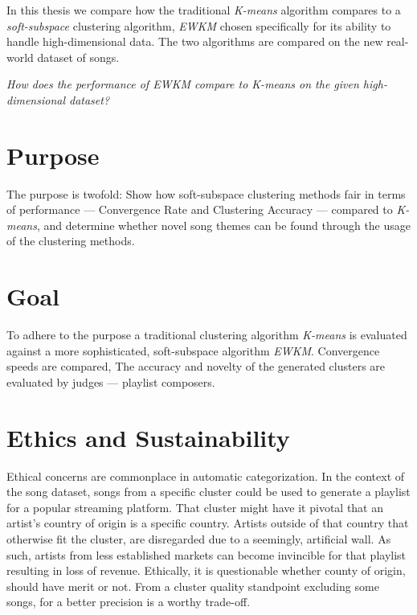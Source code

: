 \documentclass[../report.tex]{subfiles}
\begin{document}
In this thesis we compare how the traditional \textit{K-means} algorithm compares to a \textit{soft-subspace} clustering algorithm, \textit{EWKM} chosen specifically for its ability to handle high-dimensional data. The two algorithms are compared on the new real-world dataset of songs.

\textit{How does the performance of EWKM compare to K-means on the given high-dimensional dataset?}

\section{Purpose}

The purpose is twofold: Show how soft-subspace clustering methods fair in terms of performance --- Convergence Rate and Clustering Accuracy --- compared to \textit{K-means}, and determine whether novel song themes can be found through the usage of the clustering methods.



\section{Goal}
To adhere to the purpose a traditional clustering algorithm \textit{K-means} is evaluated against a more sophisticated, soft-subspace algorithm \textit{EWKM}.
Convergence speeds are compared, The accuracy and novelty of the generated clusters are evaluated by judges --- playlist composers.

\section{Ethics and Sustainability}
Ethical concerns are commonplace in automatic categorization. In the context of the song dataset, songs from a specific cluster could be used to generate a playlist for a popular streaming platform. That cluster might have it pivotal that an artist's country of origin is a specific country. Artists outside of that country that otherwise fit the cluster, are disregarded due to a seemingly, artificial wall. As such, artists from less established markets can become invincible for that playlist resulting in loss of revenue. Ethically, it is questionable whether county of origin, should have merit or not. From a cluster quality standpoint excluding some songs, for a better precision is a worthy trade-off.
\end{document}
